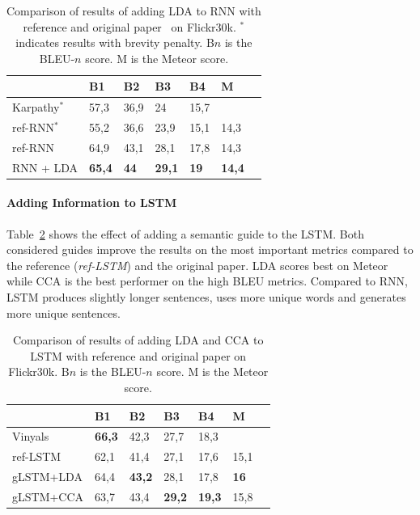 \documentclass[twoside,twocolumn]{article}
\begin{document}
	\begin{table}
		\centering
		\begin{tabular}{lllllll}
			& B1 & B2 & B3 & B4 & M \\ \hline
			Karpathy$^*$~\cite{Karpathy2015}    & 57,3   & 36,9   & 24     & 15,7   & ~           \\    
			ref-RNN$^*$     & 55,2   & 36,6   & 23,9   & 15,1   & 14,3          \\
			ref-RNN          & 64,9  & 43,1     & 28,1   & 17,8   & 14,3          \\
			RNN + LDA         & \textbf{65,4}   & \textbf{44}     & \textbf{29,1}   & \textbf{19}     & \textbf{14,4}          \\\hline
		\end{tabular}
		\caption{Comparison of results of adding LDA to RNN with reference and original paper~\cite{Karpathy2015} on Flickr30k. $^{*}$ indicates results with brevity penalty. B$n$ is the BLEU-$n$ score. M is the Meteor score.}
		\label{table:results_rnn}
	\end{table}
	
	\paragraph{Adding Information to LSTM}
	Table~\ref{table:results_lstm} shows the effect of adding a semantic guide to the LSTM. Both considered guides improve the results on the most important metrics compared to the reference (\emph{ref-LSTM}) and the original paper. LDA scores best on Meteor while CCA is the best performer on the high BLEU metrics. Compared to RNN, LSTM produces slightly longer sentences, uses more unique words and generates more unique sentences.
	\begin{table}
		\centering
		\begin{tabular}{lllllll}
			& B1 & B2 & B3 & B4 & M \\ \hline
			Vinyals~\cite{Google}      & \textbf{66,3}   & 42,3   & 27,7   & 18,3   & ~     \\ 
			ref-LSTM         & 62,1   & 41,4   & 27,1   & 17,6   & 15,1  \\
			gLSTM+LDA         & 64,4   & \textbf{43,2}   & 28,1   & 17,8   & \textbf{16}  \\
			gLSTM+CCA         & 63,7   & 43,4   & \textbf{29,2}   &\textbf{19,3}   & 15,8  \\ \hline
		\end{tabular}
		\caption{Comparison of results of adding LDA and CCA to LSTM with reference and original paper on Flickr30k. B$n$ is the BLEU-$n$ score. M is the Meteor score.}
		\label{table:results_lstm}
	\end{table}
	
\end{document}

